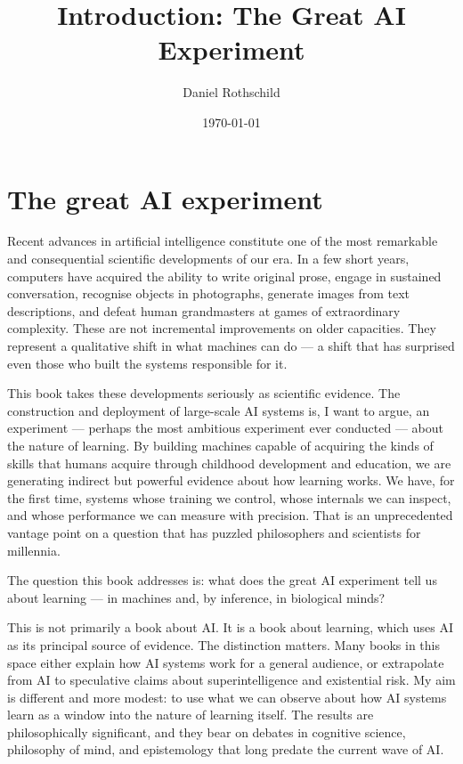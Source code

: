 \documentclass{drpaper}
\title{Introduction: The Great AI Experiment}
\author{Daniel Rothschild}
\date{\today}
\begin{document}
\maketitle

\section{The great AI experiment}

Recent advances in artificial intelligence constitute one of the most remarkable and consequential scientific developments of our era. In a few short years, computers have acquired the ability to write original prose, engage in sustained conversation, recognise objects in photographs, generate images from text descriptions, and defeat human grandmasters at games of extraordinary complexity. These are not incremental improvements on older capacities. They represent a qualitative shift in what machines can do — a shift that has surprised even those who built the systems responsible for it.

This book takes these developments seriously as scientific evidence. The construction and deployment of large-scale AI systems is, I want to argue, an experiment — perhaps the most ambitious experiment ever conducted — about the nature of learning. By building machines capable of acquiring the kinds of skills that humans acquire through childhood development and education, we are generating indirect but powerful evidence about how learning works. We have, for the first time, systems whose training we control, whose internals we can inspect, and whose performance we can measure with precision. That is an unprecedented vantage point on a question that has puzzled philosophers and scientists for millennia.

The question this book addresses is: what does the great AI experiment tell us about learning — in machines and, by inference, in biological minds?

This is not primarily a book about AI. It is a book about learning, which uses AI as its principal source of evidence. The distinction matters. Many books in this space either explain how AI systems work for a general audience, or extrapolate from AI to speculative claims about superintelligence and existential risk. My aim is different and more modest: to use what we can observe about how AI systems learn as a window into the nature of learning itself. The results are philosophically significant, and they bear on debates in cognitive science, philosophy of mind, and epistemology that long predate the current wave of AI.
\end{document}
